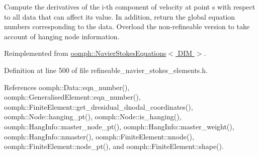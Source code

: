 Compute the derivatives of the i-\/th component of velocity at point s with respect to all data that can affect its value. In addition, return the global equation numbers corresponding to the data. Overload the non-\/refineable version to take account of hanging node information. 



Reimplemented from \hyperlink{classoomph_1_1NavierStokesEquations_aa516b523d6c3b83a01c1bd1e1f9569fe}{oomph\+::\+Navier\+Stokes\+Equations$<$ D\+I\+M $>$}.



Definition at line 500 of file refineable\+\_\+navier\+\_\+stokes\+\_\+elements.\+h.



References oomph\+::\+Data\+::eqn\+\_\+number(), oomph\+::\+Generalised\+Element\+::eqn\+\_\+number(), oomph\+::\+Finite\+Element\+::get\+\_\+dresidual\+\_\+dnodal\+\_\+coordinates(), oomph\+::\+Node\+::hanging\+\_\+pt(), oomph\+::\+Node\+::is\+\_\+hanging(), oomph\+::\+Hang\+Info\+::master\+\_\+node\+\_\+pt(), oomph\+::\+Hang\+Info\+::master\+\_\+weight(), oomph\+::\+Hang\+Info\+::nmaster(), oomph\+::\+Finite\+Element\+::nnode(), oomph\+::\+Finite\+Element\+::node\+\_\+pt(), and oomph\+::\+Finite\+Element\+::shape().

\mbox{\label{classoomph_1_1RefineableNavierStokesEquations_aa5fb8ebc1a96ed6fc7733c5aaa238582}} 
